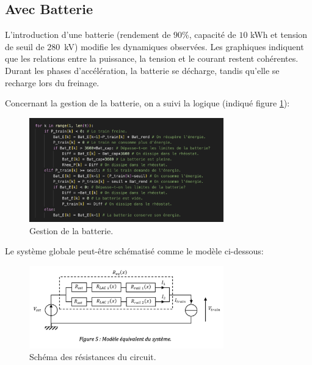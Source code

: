 \documentclass[11pt, a4paper, oneside, portrait]{report}
\begin{document}
        \subsection*{Avec Batterie}
            L’introduction d’une batterie (rendement de $90$\%{}, capacité de $10$ kWh et tension de seuil de $280$~kV) modifie les dynamiques observées. Les graphiques indiquent que les relations entre la
            puissance, la tension et le courant restent cohérentes. Durant les phases d’accélération, la
            batterie se décharge, tandis qu’elle se recharge lors du freinage.

            Concernant la gestion de la batterie, on a suivi la logique (indiqué figure \ref{fig:AdamCode_1}):

            \begin{figure}[H]
                \centering
                \includegraphics[width=0.75\textwidth]{Figures/AdamCode_1.png}
                \caption{Gestion de la batterie.}
                \label{fig:AdamCode_1}
            \end{figure}

            Le système globale peut-être schématisé comme le modèle ci-dessous:

            \begin{figure}[H]
                \centering
                \includegraphics[width=0.75\textwidth]{Figures/AdamCode_2.png}
                \caption{Schéma des résistances du circuit.}
                \label{fig:AdamCode_2}
            \end{figure}
\end{document}

